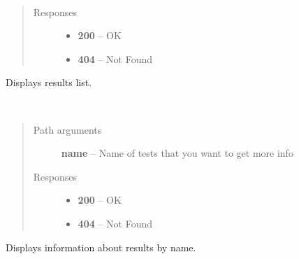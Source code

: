 \documentclass[letterpaper,10pt,english]{sphinxmanual}
\begin{document}

\begin{fulllineitems}
\label{01_how_to_use_it:method-get-results}~\begin{quote}\begin{description}
\item[{Responses}] \leavevmode\begin{itemize}
\item {} 
\textbf{200} -- OK

\item {} 
\textbf{404} -- Not Found

\end{itemize}

\end{description}\end{quote}

Displays results list.

\end{fulllineitems}


\begin{fulllineitems}
\label{01_how_to_use_it:method-get-results-name-}~\begin{quote}\begin{description}
\item[{Path arguments}] \leavevmode
\textbf{name} -- Name of tests that you want to get more info

\item[{Responses}] \leavevmode\begin{itemize}
\item {} 
\textbf{200} -- OK

\item {} 
\textbf{404} -- Not Found

\end{itemize}

\end{description}\end{quote}

Displays information about results by name.

\end{fulllineitems}

\end{document}

